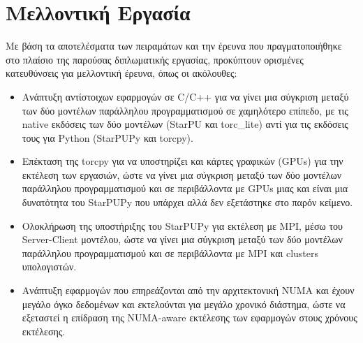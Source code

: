 \section{Μελλοντική Εργασία}

Με βάση τα αποτελέσματα των πειραμάτων και την έρευνα που πραγματοποιήθηκε στο πλαίσιο της παρούσας διπλωματικής εργασίας, προκύπτουν ορισμένες κατευθύνσεις για μελλοντική έρευνα, όπως οι ακόλουθες:

\begin{itemize}
    \item Ανάπτυξη αντίστοιχων εφαρμογών σε C/C++ για να γίνει μια σύγκριση μεταξύ των δύο μοντέλων παράλληλου προγραμματισμού σε χαμηλότερο επίπεδο, με τις native εκδόσεις των δύο μοντέλων (StarPU και torc\_lite) αντί για τις εκδόσεις τους για Python (StarPUPy και torcpy).
    \item Επέκταση της torcpy για να υποστηρίζει και κάρτες γραφικών (GPUs) για την εκτέλεση των εργασιών, ώστε να γίνει μια σύγκριση μεταξύ των δύο μοντέλων παράλληλου προγραμματισμού και σε περιβάλλοντα με GPUs μιας και είναι μια δυνατότητα του StarPUPy που υπάρχει αλλά δεν εξετάστηκε στο παρόν κείμενο.
    \item Ολοκλήρωση της υποστήριξης του StarPUPy για εκτέλεση με MPI, μέσω του Server-Client μοντέλου, ώστε να γίνει μια σύγκριση μεταξύ των δύο μοντέλων παράλληλου προγραμματισμού και σε περιβάλλοντα με MPI και clusters υπολογιστών.
    \item Ανάπτυξη εφαρμογών που επηρεάζονται από την αρχιτεκτονική NUMA και έχουν μεγάλο όγκο δεδομένων και εκτελούνται για μεγάλο χρονικό διάστημα, ώστε να εξεταστεί η επίδραση της NUMA-aware εκτέλεσης των εφαρμογών στους χρόνους εκτέλεσης.
\end{itemize}

